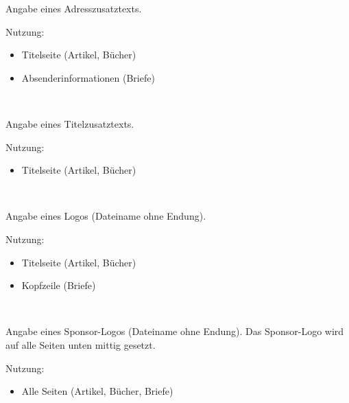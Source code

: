 \DescribeMacro{\adresszusatz}
Angabe eines Adresszusatztexts.

Nutzung:
\begin{itemize}
	\item Titelseite (Artikel, Bücher)
	\item Absenderinformationen (Briefe)
\end{itemize}

\begin{nutzung}
		\>\\
	\beispiel
		\>
\end{nutzung}

\DescribeMacro{\titelzusatz}
Angabe eines Titelzusatztexts.

Nutzung:
\begin{itemize}
	\item Titelseite (Artikel, Bücher)
\end{itemize}

\begin{nutzung}
		\>\\
	\beispiel
		\>
\end{nutzung}

\DescribeMacro{\logo}
Angabe eines Logos (Dateiname ohne Endung).

Nutzung:
\begin{itemize}
	\item Titelseite (Artikel, Bücher)
	\item Kopfzeile (Briefe)
\end{itemize}

\begin{nutzung}
		\>\\
	\beispiel
		\>
\end{nutzung}

\DescribeMacro{\sponsorlogo}
Angabe eines Sponsor-Logos (Dateiname ohne Endung).
Das Sponsor-Logo wird auf alle Seiten unten mittig gesetzt.

Nutzung:
\begin{itemize}
	\item Alle Seiten (Artikel, Bücher, Briefe)
\end{itemize}

\begin{nutzung}
		\>\\
	\beispiel
		\>
\end{nutzung}


